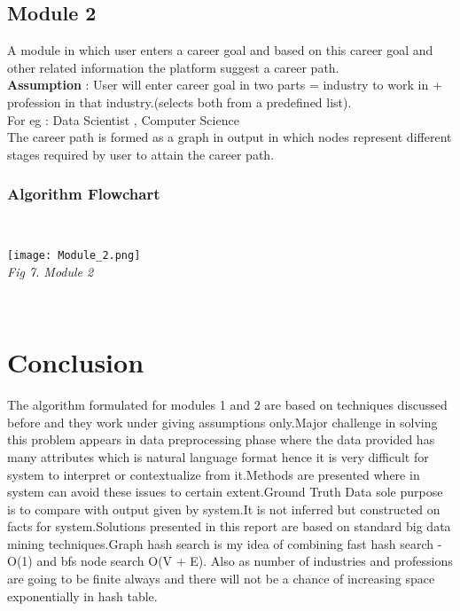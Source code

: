 \documentclass[journal]{IEEEtran}
\begin{document}
    \subsection{Module 2}
     A module in which user enters a career goal and based on this career goal and other related information the platform suggest a career path. 
     \\\textbf{Assumption} : User will enter career goal in two parts = industry to work in  + profession in that industry.(selects both from a predefined list).
     \\For eg : Data Scientist , Computer Science
     \\The career path is formed as a graph in output in which nodes represent different stages required by user to attain the career path.
     \\
        \subsubsection{\textbf{Algorithm Flowchart}}
        \\
            \begin{center}
                \texttt{[image: Module\_2.png]}
                \\
                \caption{\textit{Fig 7. Module 2}}
            \end{center}
        \\  
\section{\textbf{Conclusion}}
The algorithm formulated for modules 1 and 2 are based on techniques discussed before and they work under giving assumptions only.Major challenge in solving this problem appears in data preprocessing phase where the data provided has many attributes which is natural language format hence it is very difficult for system to interpret or contextualize from it.Methods are presented where in system can avoid these issues to certain extent.Ground Truth Data sole purpose is to compare with output given by system.It is not inferred but constructed on facts for system.Solutions presented in this report are based on standard big data mining techniques.Graph hash search is my idea of combining fast hash search - O(1) and bfs node search O(V + E).
Also as number of industries and professions are going to be finite always and there will not be a chance of increasing space exponentially in hash table.
\end{document}
